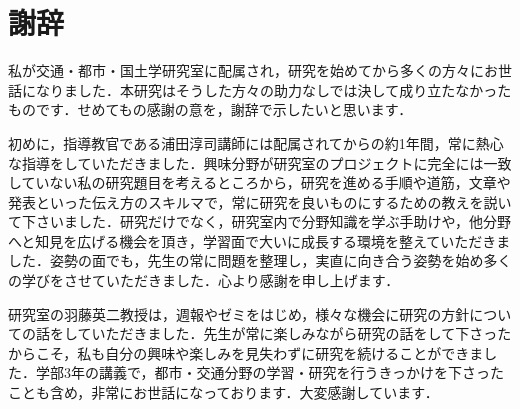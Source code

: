 \chapter*{謝辞}
私が交通・都市・国土学研究室に配属され，研究を始めてから多くの方々にお世話になりました．本研究はそうした方々の助力なしでは決して成り立たなかったものです．せめてもの感謝の意を，謝辞で示したいと思います．

初めに，指導教官である浦田淳司講師には配属されてからの約1年間，常に熱心な指導をしていただきました．興味分野が研究室のプロジェクトに完全には一致していない私の研究題目を考えるところから，研究を進める手順や道筋，文章や発表といった伝え方のスキルマで，常に研究を良いものにするための教えを説いて下さいました．研究だけでなく，研究室内で分野知識を学ぶ手助けや，他分野へと知見を広げる機会を頂き，学習面で大いに成長する環境を整えていただきました．姿勢の面でも，先生の常に問題を整理し，実直に向き合う姿勢を始め多くの学びをさせていただきました．心より感謝を申し上げます．

研究室の羽藤英二教授は，週報やゼミをはじめ，様々な機会に研究の方針についての話をしていただきました．先生が常に楽しみながら研究の話をして下さったからこそ，私も自分の興味や楽しみを見失わずに研究を続けることができました．学部3年の講義で，都市・交通分野の学習・研究を行うきっかけを下さったことも含め，非常にお世話になっております．大変感謝しています．

